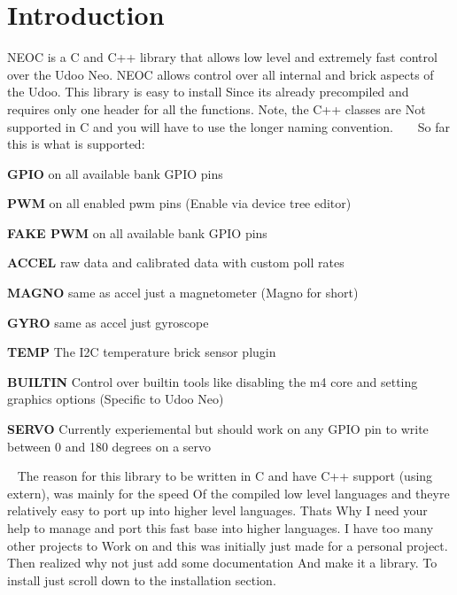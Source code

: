 \hypertarget{index_intro_sec}{}\section{Introduction}\label{index_intro_sec}
N\+E\+OC is a C and C++ library that allows low level and extremely fast control over the Udoo Neo. N\+E\+OC allows control over all internal and brick aspects of the Udoo. This library is easy to install Since it\textquotesingle{}s already precompiled and requires only one header for all the functions. Note, the C++ classes are Not supported in C and you will have to use the longer naming convention. ~\newline
~\newline
So far this is what is supported\+: 
\begin{DoxyEnumerate}
\item {\bfseries G\+P\+IO} on all available bank G\+P\+IO pins 
\item {\bfseries P\+WM} on all enabled pwm pins (Enable via device tree editor) 
\item {\bfseries F\+A\+KE P\+WM} on all available bank G\+P\+IO pins 
\item {\bfseries A\+C\+C\+EL} raw data and calibrated data with custom poll rates 
\item {\bfseries M\+A\+G\+NO} same as accel just a magnetometer (Magno for short) 
\item {\bfseries G\+Y\+RO} same as accel just gyroscope 
\item {\bfseries T\+E\+MP} The I2C temperature brick sensor plugin 
\item {\bfseries B\+U\+I\+L\+T\+IN} Control over builtin tools like disabling the m4 core and setting graphics options (Specific to Udoo Neo) 
\item {\bfseries S\+E\+R\+VO} Currently experiemental but should work on any G\+P\+IO pin to write between 0 and 180 degrees on a servo 
\end{DoxyEnumerate}~\newline
 The reason for this library to be written in C and have C++ support (using extern), was mainly for the speed Of the compiled low level languages and they\textquotesingle{}re relatively easy to port up into higher level languages. That\textquotesingle{}s Why I need your help to manage and port this fast base into higher languages. I have too many other projects to Work on and this was initially just made for a personal project. Then realized why not just add some documentation And make it a library. To install just scroll down to the installation section.

